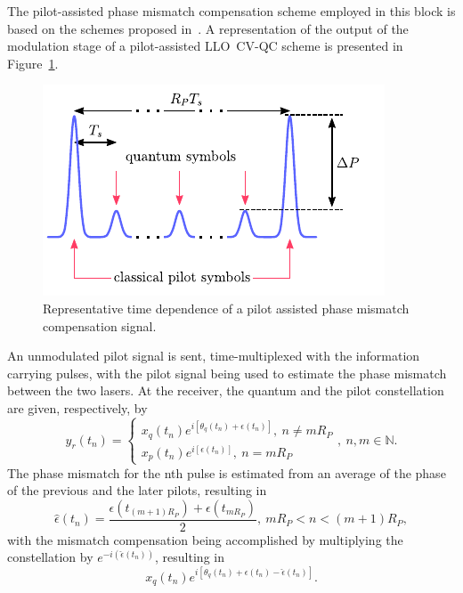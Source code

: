 \begin{refsection}
The pilot-assisted phase mismatch compensation scheme employed in this block is based on the schemes proposed in~\cite{soh15,qi15}. A representation of the output of the modulation stage of a pilot-assisted \mbox{LLO CV-QC} scheme is presented in Figure~\ref{fig:pilotAssistedTimeDependence}. 
%
\begin{figure}[h]
\centering
\includegraphics{./lib/phase_mismatch_compensation/figures/novelMethodTimeDependence.pdf}
\caption{Representative time dependence of a pilot assisted phase mismatch compensation signal.}
\label{fig:pilotAssistedTimeDependence}
\end{figure}
%
An unmodulated pilot signal is sent, time-multiplexed with the information carrying pulses, with the pilot signal being used to estimate the phase mismatch between the two lasers. At the receiver, the quantum and the pilot constellation are given, respectively, by
%
\begin{equation}\label{eq:signalAfterCoherentDetection} 
y_r(t_n)=
\begin{cases}
x_q(t_n)e^{i[\theta_q(t_n)+\epsilon(t_n)]},~n\neq mR_P \\
x_p(t_n)e^{i[\epsilon(t_n)]},~n=mR_P
\end{cases},~n,m\in\mathbb{N}.
\end{equation}
%
The phase mismatch for the nth pulse is estimated from an average of the phase of the previous and the later pilots, resulting in
\begin{equation}
\hat{\epsilon}(t_n)=\frac{\epsilon(t_{(m+1)R_P})+\epsilon(t_{mR_P})}{2},~mR_P<n<(m+1)R_P,
\end{equation}
with the mismatch compensation being accomplished by multiplying the constellation by $e^{-i(\hat{\epsilon}(t_n))}$, resulting in
\begin{equation}
x_q(t_n)e^{i[\theta_q(t_n)+\epsilon(t_n)-\hat{\epsilon}(t_n)]}.
\end{equation}


\clearpage
\printbibliography[heading=subbibliography]
\end{refsection}
\cleardoublepage

